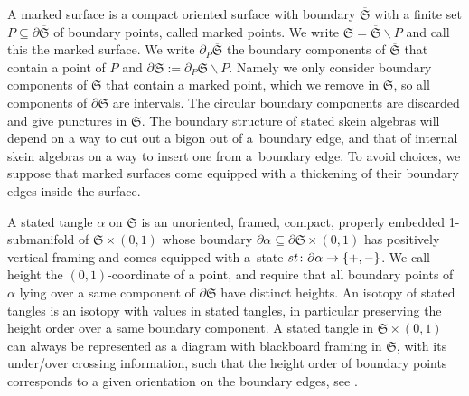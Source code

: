 \documentclass[11pt]{article}
\numberwithin{equation}{section}
\numberwithin{equation}{section}
\begin{document}
\begin{Definition}
A marked surface is a compact oriented surface with boundary $\overline{\mathfrak{S}}$ with a finite set $P\subseteq \partial\overline{\mathfrak{S}}$ of boundary points, called marked points. We write $\mathfrak{S} = \overline{\mathfrak{S}} \smallsetminus P$ and call this the marked surface. We write $\partial_P\overline{\mathfrak{S}}$ the boundary components of $\overline{\mathfrak{S}}$ that contain a point of $P$ and $\partial \mathfrak{S} := \partial_P\overline{\mathfrak{S}} \smallsetminus P$. Namely we only consider boundary components of $\mathfrak{S}$ that contain a marked point, which we remove in $\mathfrak{S}$, so all components of $\partial \mathfrak{S}$ are intervals. The circular boundary components are discarded and give punctures in $\mathfrak{S}$. The boundary structure of stated skein algebras will depend on a way to cut out a bigon out of a~boundary edge, and that of internal skein algebras on a way to insert one from a~boundary edge. To avoid choices, we suppose that marked surfaces come equipped with a thickening of their boundary edges inside the surface.

A stated tangle $\alpha$ on $\mathfrak{S}$ is an unoriented, framed, compact, properly embedded 1-submanifold of $\mathfrak{S} \times (0,1)$ whose boundary $\partial \alpha \subseteq \partial\mathfrak{S} \times (0,1)$ has positively vertical framing and comes equipped with a~state ${\rm st}\colon \partial \alpha \to \{+,-\}$. We call height the $(0,1)$-coordinate of a point, and require that all boundary points of $\alpha$ lying over a same component of $\partial\mathfrak{S}$ have distinct heights. An isotopy of stated tangles is an isotopy with values in stated tangles, in particular preserving the height order over a same boundary component. A stated tangle in $\mathfrak{S} \times (0,1)$ can always be represented as a diagram with blackboard framing in $\mathfrak{S}$, with its under/over crossing information, such that the height order of boundary points corresponds to a given orientation on the boundary edges, see \cite[Section~3.5]{BonahonWong}.
\end{Definition}
\end{document}

